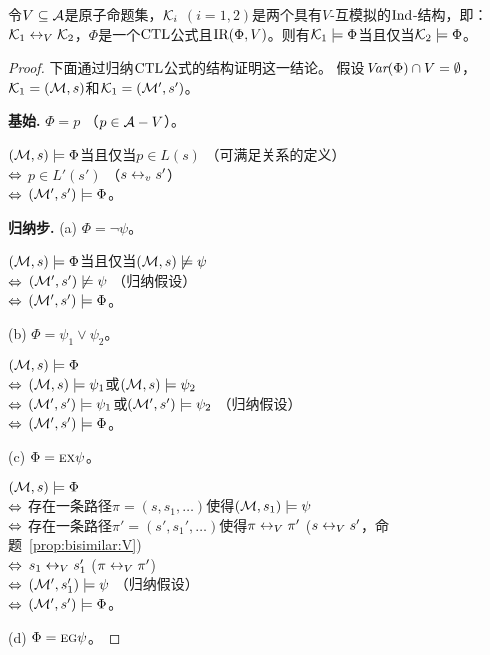 \begin{theorem}\label{thm:V-bisimulation:EQ}
	令$V\subseteq {\cal A}$是原子命题集，${\cal K}_i$ $(i=1,2)$是两个具有$V$-互模拟的$\textrm{Ind}$-结构，即：${\cal K}_1 \leftrightarrow_V {\cal K}_2$，$\Phi$是一个$\textrm{CTL}$公式且$\textrm{IR}(\Phi, V)$。则有${\cal K}_1\models \Phi$当且仅当${\cal K}_2\models \Phi$。
\end{theorem}
\begin{proof}
	下面通过归纳$\textrm{CTL}$公式的结构证明这一结论。
	假设$\textit{Var}(\Phi) \cap V=\emptyset$，${\cal K}_1=({\cal M},s)$和${\cal K}_1=({\cal M}',s')$。
	
	\textbf{基始.} $\Phi = p$ （$p\in {\cal A} -V$）。
	
	$({\cal M},s)\models \Phi$当且仅当$p\in L(s)$ \hfill （可满足关系的定义）\\
	$\Leftrightarrow$ $p\in L'(s')$ \hfill （$s \leftrightarrow_v s'$）\\
	$\Leftrightarrow$ $({\cal M}',s') \models \Phi$。
	
	\textbf{归纳步.} (a) $\Phi = \neg \psi$。
	
	$({\cal M},s)\models \Phi$当且仅当$({\cal M},s) \not \models \psi$\\
	$\Leftrightarrow$ $({\cal M}',s')\not \models \psi$  \hfill （归纳假设）\\
	$\Leftrightarrow$ $({\cal M}',s') \models \Phi$。
	
	(b) $\Phi = \psi_1 \vee \psi_2$。
	
	$({\cal M},s)\models \Phi$\\
	$\Leftrightarrow$ $({\cal M},s) \models \psi_1$或$({\cal M},s) \models \psi_2$\\
	$\Leftrightarrow$ $({\cal M}',s')  \models \psi_1$或$({\cal M}',s') \models \psi_2$ \hfill （归纳假设）\\
	$\Leftrightarrow$ $({\cal M}',s') \models \Phi$。
	
	(c) $\Phi=\textsc{e}\textsc{x}\psi$。
	
	$({\cal M},s)\models \Phi$\\
	$\Leftrightarrow$ 存在一条路径$\pi=(s,s_1,\dots)$使得$({\cal M},s_1)\models \psi$\\
	$\Leftrightarrow$ 存在一条路径$\pi'=(s',s_1',\dots)$使得$\pi \leftrightarrow_V \pi'$ \hfill ($s \leftrightarrow_V s'$，命题~\ref{prop:bisimilar:V})\\
	$\Leftrightarrow$ $s_1 \leftrightarrow_V s_1'$ \hfill ($\pi \leftrightarrow_V \pi'$)\\
	$\Leftrightarrow$ $({\cal M}',s_1') \models \psi$   \hfill   （归纳假设）\\
	$\Leftrightarrow$ $({\cal M}',s')\models \Phi$。
	
	(d) $\Phi = \textsc{e} \textsc{g} \psi$。
	

\end{proof}
